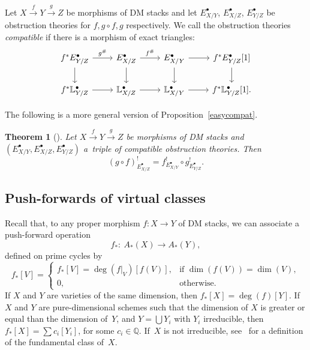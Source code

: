 \documentclass[pdftex]{sigma}
\numberwithin{equation}{section}
\newtheorem{Theorem}{Theorem}[section]
\begin{document}
\begin{Definition} Let $X\xrightarrow{f} Y\xrightarrow{g} Z$ be morphisms of DM stacks and let $E^{\bullet}_{X/Y}$, $E^{\bullet}_{X/Z}$, $E^{\bullet}_{Y/Z}$ be obstruction theories for $f,g\circ f, g$ respectively. We call the obstruction theories \emph{compatible} if there is a morphism of exact triangles:
\[\begin{tikzcd}
f^*E^{\bullet}_{Y/Z}\ar[r,"g^{\#}"]\ar[d] & E^{\bullet}_{X/Z}\ar[r,"f^{\#}"]\ar[d] & E^{\bullet}_{X/Y}\ar[r]\ar[d] & f^*E^{\bullet}_{Y/Z}[1]\ar[d] \\
f^*\mathbb L^{\bullet}_{Y/Z}\ar[r] & \mathbb L^{\bullet}_{X/Z}\ar[r] & \mathbb L^{\bullet}_{X/Y}\ar[r] & f^*\mathbb L^{\bullet}_{Y/Z}[1].
\end{tikzcd}
\]
\end{Definition}
The following is a more general version of Proposition~\ref{easycompat}.
\begin{Theorem}[\cite{vir-pull}]
Let $X\xrightarrow{f} Y\xrightarrow{g} Z$ be morphisms of DM stacks and $(E^{\bullet}_{X/Y}, E^{\bullet}_{X/Z},E^{\bullet}_{Y/Z})$ a~triple of compatible obstruction theories. Then
\[(g\circ f)^{!}_{E^{\bullet}_{X/Z}}=f^{!}_{E^{\bullet}_{X/Y}}\circ g^{!}_{E^{\bullet}_{Y/Z}}.\]
\end{Theorem}

\subsection{Push-forwards of virtual classes}
Recall that, to any proper morphism $f\colon X\to Y$ of DM stacks, we can associate a push-forward operation
\[f_*\colon \ A_*(X)\to A_*(Y),\]
defined on prime cycles by
\[f_*[V]=\begin{cases}f_*[V]=\deg(f|_{V})[f(V)], &\text{if $\dim(f(V))=\dim(V)$},\\
0, &\text{otherwise.}
\end{cases}
\]
If $X$ and $Y$ are varieties of the same dimension, then $f_*[X]=\deg(f)[Y]$. If $X$ and $Y$ are pure-dimensional schemes such that the dimension of $X$ is greater or equal than the dimension of~$Y$, and $Y=\bigcup Y_i$ with $Y_i$ irreducible, then $f_*[X]=\sum c_i[Y_i]$, for some $c_i\in\mathbb Q$. If~$X$ is not irreducible, see~\cite[Chapter 1]{Fulton} for a definition of the fundamental class of~$X$.
\end{document}
